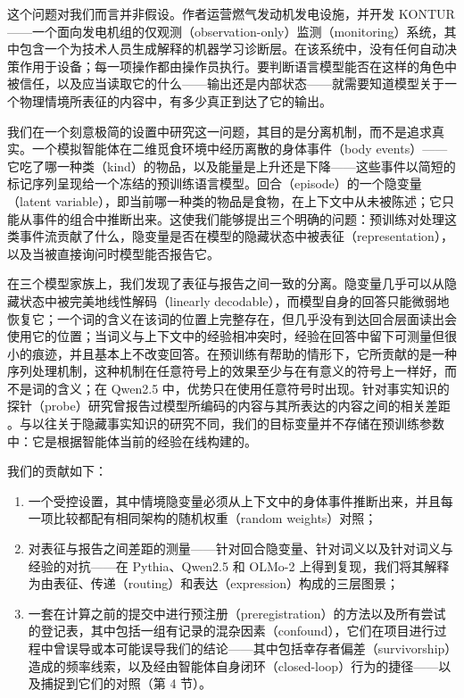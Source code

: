 \documentclass[UTF8,fontset=none,a4paper]{ctexart}
\begin{document}
这个问题对我们而言并非假设。作者运营燃气发动机发电设施，并开发 KONTUR------一个面向发电机组的仅观测（\mbox{observation-only}）监测（monitoring）系统，其中包含一个为技术人员生成解释的机器学习诊断层。在该系统中，没有任何自动决策作用于设备；每一项操作都由操作员执行。要判断语言模型能否在这样的角色中被信任，以及应当读取它的什么------输出还是内部状态------就需要知道模型关于一个物理情境所表征的内容中，有多少真正到达了它的输出。

我们在一个刻意极简的设置中研究这一问题，其目的是分离机制，而不是追求真实。一个模拟智能体在二维觅食环境中经历离散的身体事件（body events）------它吃了哪一种类（kind）的物品，以及能量是上升还是下降------这些事件以简短的标记序列呈现给一个冻结的预训练语言模型。回合（episode）的一个隐变量（latent variable），即当前哪一种类的物品是食物，在上下文中从未被陈述；它只能从事件的组合中推断出来。这使我们能够提出三个明确的问题：预训练对处理这类事件流贡献了什么，隐变量是否在模型的隐藏状态中被表征（representation），以及当被直接询问时模型能否报告它。

在三个模型家族上，我们发现了表征与报告之间一致的分离。隐变量几乎可以从隐藏状态中被完美地线性解码（linearly decodable），而模型自身的回答只能微弱地恢复它；一个词的含义在该词的位置上完整存在，但几乎没有到达回合层面读出会使用它的位置；当词义与上下文中的经验相冲突时，经验在回答中留下可测量但很小的痕迹，并且基本上不改变回答。在预训练有帮助的情形下，它所贡献的是一种序列处理机制，这种机制在任意符号上的效果至少与在有意义的符号上一样好，而不是词的含义；在 Qwen2.5 中，优势只在使用任意符号时出现。针对事实知识的探针（probe）研究曾报告过模型所编码的内容与其所表达的内容之间的相关差距 \citep{orgad2024,gekhman2025,burns2022,azaria2023}。与以往关于隐藏事实知识的研究不同，我们的目标变量并不存储在预训练参数中：它是根据智能体当前的经验在线构建的。

我们的贡献如下：
\begin{enumerate}
\item 一个受控设置，其中情境隐变量必须从上下文中的身体事件推断出来，并且每一项比较都配有相同架构的随机权重（random weights）对照；
\item 对表征与报告之间差距的测量------针对回合隐变量、针对词义以及针对词义与经验的对抗------在 Pythia、Qwen2.5 和 \mbox{OLMo-2} 上得到复现，我们将其解释为由表征、传递（routing）和表达（expression）构成的三层图景；
\item 一套在计算之前的提交中进行预注册（preregistration）的方法以及所有尝试的登记表，其中包括一组有记录的混杂因素（confound），它们在项目进行过程中曾误导或本可能误导我们的结论------其中包括幸存者偏差（survivorship）造成的频率线索，以及经由智能体自身闭环（\mbox{closed-loop}）行为的捷径------以及捕捉到它们的对照（第 4 节）。
\end{enumerate}
\end{document}
